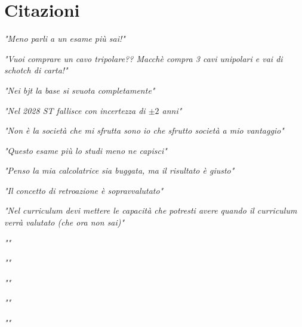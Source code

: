 \chapter{Citazioni}

\raggedright
{\itshape "Meno parli a un esame più sai!"}
\raggedleft

\vspace{5mm}

\raggedleft
{\itshape "Vuoi comprare un cavo tripolare?? Macchè compra 3 cavi unipolari e vai di schotch di carta!"}
\raggedright

\vspace{5mm}

\raggedright
{\itshape "Nei bjt la base si svuota completamente"}
\raggedleft

\vspace{5mm}

\raggedleft
{\itshape "Nel 2028 ST fallisce con incertezza di $\pm 2$ anni"}
\raggedright

\vspace{5mm}

\raggedright
{\itshape "Non è la società che mi sfrutta sono io che sfrutto società a mio vantaggio"}
\raggedleft

\vspace{5mm}

\raggedleft
{\itshape "Questo esame più lo studi meno ne capisci"}
\raggedright

\vspace{5mm}

\raggedright
{\itshape "Penso la mia calcolatrice sia buggata, ma il risultato è giusto"}
\raggedleft

\vspace{5mm}

\raggedleft
{\itshape "Il concetto di retroazione è sopravvalutato"}
\raggedright

\vspace{5mm}

\raggedright
{\itshape "Nel curriculum devi mettere le capacità che potresti avere quando il curriculum verrà valutato (che ora non sai)"}
\raggedleft

\vspace{5mm}

\raggedleft
{\itshape ""}
\raggedright

\vspace{5mm}

\raggedright
{\itshape ""}
\raggedleft

\vspace{5mm}

\raggedleft
{\itshape ""}
\raggedright

\vspace{5mm}

\raggedright
{\itshape ""}
\raggedleft

\vspace{5mm}

\raggedleft
{\itshape ""}
\raggedright
